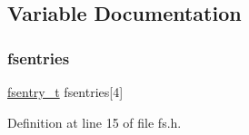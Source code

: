 \subsection{Variable Documentation}
\mbox{\label{a00128_a6b46131164b26e476762930c9aae4319_a6b46131164b26e476762930c9aae4319}} 
\subsubsection{\texorpdfstring{fsentries}{fsentries}}
{\footnotesize\ttfamily \hyperlink{a00128_a9ccf6560e8aebea3e4402a31e8c0f46b_a9ccf6560e8aebea3e4402a31e8c0f46b}{fsentry\+\_\+t} fsentries\mbox{[}4\mbox{]}}



Definition at line 15 of file fs.\+h.

